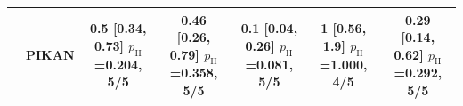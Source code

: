 \begin{tabular}{llccccc}
 & PIKAN & \makecell{0.5 [0.34, 0.73]\\{\scriptsize $p_{\mathrm{H}}$=0.204, 5/5}} & \makecell{0.46 [0.26, 0.79]\\{\scriptsize $p_{\mathrm{H}}$=0.358, 5/5}} & \makecell{0.1 [0.04, 0.26]\\{\scriptsize $p_{\mathrm{H}}$=0.081, 5/5}} & \makecell{1 [0.56, 1.9]\\{\scriptsize $p_{\mathrm{H}}$=1.000, 4/5}} & \makecell{0.29 [0.14, 0.62]\\{\scriptsize $p_{\mathrm{H}}$=0.292, 5/5}}\\
\bottomrule
\end{tabular}